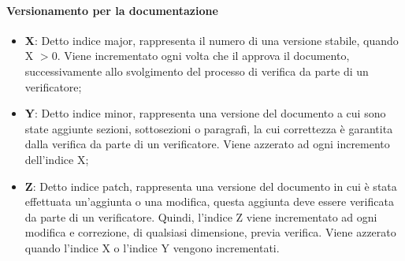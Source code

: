 \paragraph{Versionamento per la documentazione}\hbox{}
\begin{itemize}
	\item \textbf{X}: Detto indice major, rappresenta il numero di una versione stabile, quando X $> 0$.
	Viene incrementato ogni volta che il \Responsabile{} approva il documento, successivamente allo svolgimento del processo di verifica da parte di un verificatore;
	\item \textbf{Y}: Detto indice minor, rappresenta una versione del documento a cui sono state aggiunte sezioni, sottosezioni o paragrafi, la cui correttezza è garantita dalla verifica da parte di un verificatore. 
	Viene azzerato ad ogni incremento dell'indice X;
	\item \textbf{Z}: Detto indice patch, rappresenta una versione del documento in cui è stata effettuata un'aggiunta o una modifica, questa aggiunta deve essere verificata da parte di un verificatore.
	Quindi, l'indice Z viene incrementato ad ogni modifica e correzione, di qualsiasi dimensione, previa verifica.
	Viene azzerato quando l'indice X o l'indice Y vengono incrementati.
\end{itemize}

